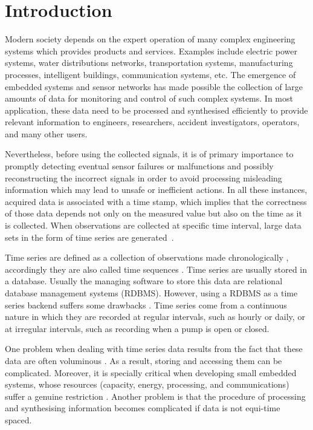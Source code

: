 \section{Introduction}

Modern society depends on the expert operation of many complex
engineering systems which provides products and services. Examples
include electric power systems, water distributions networks,
transportation systems, manufacturing processes, intelligent
buildings, communication systems, etc. The emergence of embedded
systems and sensor networks has made possible the collection of large
amounts of data for monitoring and control of such complex systems. In
most application, these data need to be processed and synthesised
efficiently to provide relevant information to engineers, researchers,
accident investigators, operators, and many other users.

Nevertheless, before using the collected signals, it is of primary
importance to promptly detecting eventual sensor failures or
malfunctions and possibly reconstructing the incorrect signals in
order to avoid processing misleading information which may lead to
unsafe or inefficient actions.  In all these instances, acquired data
is associated with a time stamp, which implies that the correctness of
those data depends not only on the measured value but also on the time
as it is collected. When observations are collected at specific time
interval, large data sets in the form of time series are
generated~\cite{basu07:_autom}.  

Time series are defined as a collection of observations made
chronologically \cite{fu11}, accordingly they are also called time
sequences \cite{last:hetland}.  Time series are usually stored in a
database. Usually the managing software to store this data are
relational database management systems (RDBMS). However, using a RDBMS
as a time series backend suffers some drawbacks
\cite{dreyer94,schmidt95,stonebraker09:scidb,zhang11}. Time series
come from a continuous nature in which they are recorded at regular
intervals, such as hourly or daily, or at irregular intervals, such as
recording when a pump is open or closed.

One problem when dealing with time series data results from the fact
that these data are often voluminous \cite{fu11}. As a result, storing
and accessing them can be complicated. Moreover, it is specially
critical when developing small embedded systems, whose resources
(capacity, energy, processing, and communications) suffer a genuine
restriction \cite{yaogehrke02}.  Another problem is that the procedure
of processing and synthesising information becomes complicated if data
is not equi-time spaced.



